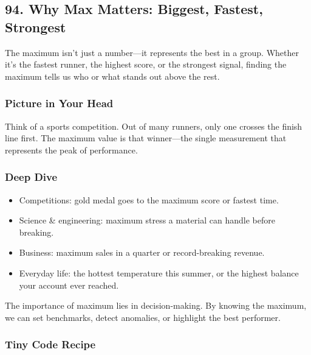 \documentclass[
  letterpaper,
  DIV=11,
  numbers=noendperiod]{scrreprt}
\providecommand{\tightlist}{%
  \setlength{\itemsep}{0pt}\setlength{\parskip}{0pt}}
\begin{document}
\subsection{94. Why Max Matters: Biggest, Fastest,
Strongest}\label{why-max-matters-biggest-fastest-strongest}

The maximum isn't just a number---it represents the best in a group.
Whether it's the fastest runner, the highest score, or the strongest
signal, finding the maximum tells us who or what stands out above the
rest.

\subsubsection{Picture in Your Head}\label{picture-in-your-head-94}

Think of a sports competition. Out of many runners, only one crosses the
finish line first. The maximum value is that winner---the single
measurement that represents the peak of performance.

\subsubsection{Deep Dive}\label{deep-dive-64}

\begin{itemize}
\tightlist
\item
  Competitions: gold medal goes to the maximum score or fastest time.
\item
  Science \& engineering: maximum stress a material can handle before
  breaking.
\item
  Business: maximum sales in a quarter or record-breaking revenue.
\item
  Everyday life: the hottest temperature this summer, or the highest
  balance your account ever reached.
\end{itemize}

The importance of maximum lies in decision-making. By knowing the
maximum, we can set benchmarks, detect anomalies, or highlight the best
performer.

\subsubsection{Tiny Code Recipe}\label{tiny-code-recipe-92}
\end{document}
